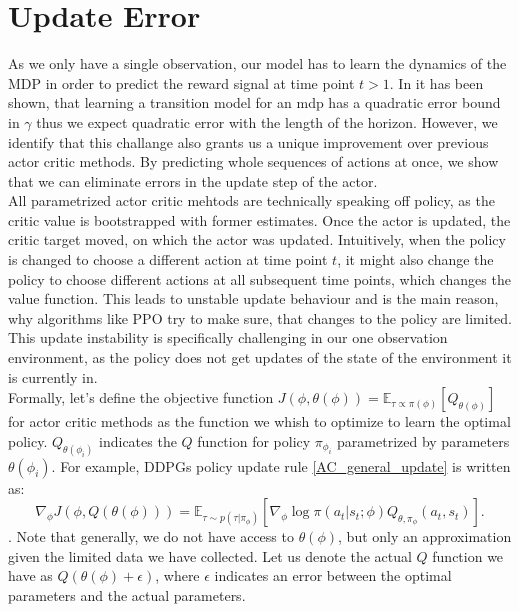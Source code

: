 \section{Update Error}
As we only have a single observation, our model has to learn the dynamics of the MDP in order to predict the reward signal at time point $t > 1$. In \cite{NEURIPS2020_b5c01503} 
it has been shown, that learning a transition model for an mdp has a quadratic error bound in $\gamma$ thus we expect quadratic error with the length of the horizon. 
However, we identify that this challange also grants us a unique improvement over previous actor critic methods. By predicting whole sequences of actions at once, 
we show that we can eliminate errors in the update step of the actor.\\
All parametrized actor critic mehtods are technically speaking off policy, as the critic value is bootstrapped with former estimates. Once the actor is updated, the 
critic target moved, on which the actor was updated. Intuitively, when the policy is changed to choose a different action at time point $t$, it might also change 
the policy to choose different actions at 
all subsequent time points, which changes the value function. This leads to unstable update behaviour and is the main reason, why algorithms like PPO try to 
make sure, that changes to the policy are limited. This update instability is specifically challenging in our one observation environment, as the policy does not 
get updates of the state of the environment it is currently in. \\
Formally, let's define the objective function $J(\phi, \theta(\phi)) = \mathbb{E}_{\tau \propto \pi(\phi)}\left[Q_{\theta(\phi)}\right]$ for actor critic methods as the function we whish to optimize to learn the optimal policy. 
$Q_{\theta(\phi_i)}$ indicates the $Q$ function for policy $\pi_{\phi_{i}}$ parametrized by parameters 
$\theta(\phi_i)$. For example, DDPGs policy update rule \ref{AC_general_update} is written as:
\begin{equation}
    \nabla_{\phi} J(\phi, Q(\theta(\phi))) = \mathbb{E}_{\tau \sim p(\tau | \pi_{\phi})} \left[\nabla_{\phi} \log \pi(a_t|s_t;\phi) Q_{\theta, \pi_\phi}(a_t, s_t) \right].
\end{equation}
. Note that generally, we do not have access to $\theta(\phi)$, but only an approximation given the limited data we have collected. Let us denote the actual 
$Q$ function we have as $Q(\theta(\phi) + \epsilon)$, where $\epsilon$ indicates an error between the optimal parameters and the actual parameters.
